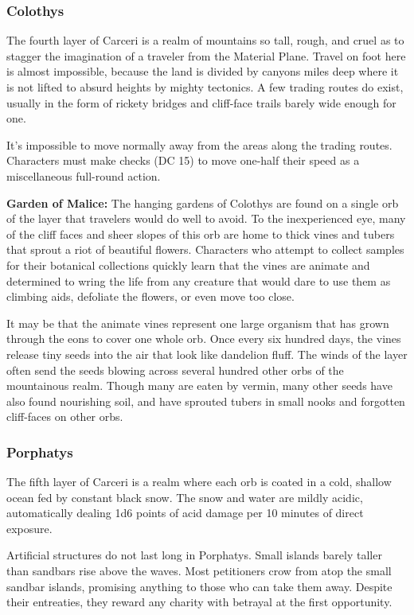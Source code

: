 \subsubsection{Colothys}
The fourth layer of Carceri is a realm of mountains so tall, rough, and cruel as to stagger the imagination of a traveler from the Material Plane. Travel on foot here is almost impossible, because the land is divided by canyons miles deep where it is not lifted to absurd heights by mighty tectonics. A few trading routes do exist, usually in the form of rickety bridges and cliff-face trails barely wide enough for one.

It's impossible to move normally away from the areas along the trading routes. Characters must make  checks (DC 15) to move one-half their speed as a miscellaneous full-round action.

\textbf{Garden of Malice:} The hanging gardens of Colothys are found on a single orb of the layer that travelers would do well to avoid. To the inexperienced eye, many of the cliff faces and sheer slopes of this orb are home to thick vines and tubers that sprout a riot of beautiful flowers. Characters who attempt to collect samples for their botanical collections quickly learn that the vines are animate and determined to wring the life from any creature that would dare to use them as climbing aids, defoliate the flowers, or even move too close.

It may be that the animate vines represent one large organism that has grown through the eons to cover one whole orb. Once every six hundred days, the vines release tiny seeds into the air that look like dandelion fluff. The winds of the layer often send the seeds blowing across several hundred other orbs of the mountainous realm. Though many are eaten by vermin, many other seeds have also found nourishing soil, and have sprouted tubers in small nooks and forgotten cliff-faces on other orbs.

\subsubsection{Porphatys}
The fifth layer of Carceri is a realm where each orb is coated in a cold, shallow ocean fed by constant black snow. The snow and water are mildly acidic, automatically dealing 1d6 points of acid damage per 10 minutes of direct exposure.

Artificial structures do not last long in Porphatys. Small islands barely taller than sandbars rise above the waves. Most petitioners crow from atop the small sandbar islands, promising anything to those who can take them away. Despite their entreaties, they reward any charity with betrayal at the first opportunity.

